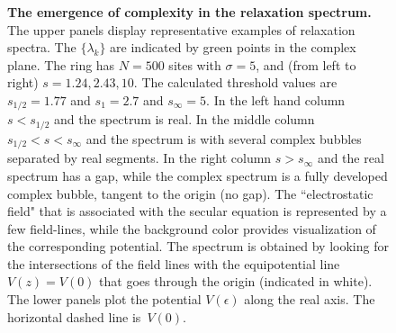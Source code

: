 \documentclass[aps,pre,floats,floatfix,twocolumn]{revtex4}
\begin{document}
\begin{figure}
\caption{\label{froots} 
{\bf The emergence of complexity in the relaxation spectrum.} 
The upper panels display representative examples of relaxation spectra.
The $\{\lambda_k\}$ are indicated by green points in the complex plane. 
The ring has $N{=}500$ sites with $\sigma{=}5$, 
and (from left to right) ${s=1.24, 2.43, 10}$. 
The calculated threshold values are ${s_{1/2}=1.77}$ and ${s_1=2.7}$ and ${s_{\infty}=5}$.
In the left hand column ${s<s_{1/2}}$ and the spectrum is real.
In the middle column ${s_{1/2} < s < s_{\infty}}$ and the spectrum is  
with several complex bubbles separated by real segments. 
In the right column  ${s>s_{\infty}}$ and the real spectrum has a gap, 
while the complex spectrum is a fully developed complex bubble, 
tangent to the origin (no gap). 
%
The ``electrostatic field" that is associated with the secular equation 
is represented by a few field-lines, while the background color provides 
visualization of the corresponding potential. 
The spectrum is obtained by looking  for the intersections 
of the field lines with the equipotential line ${V(z)=V(0)}$ 
that goes through the origin (indicated in white). 
%
The lower panels plot the potential $V(\epsilon)$ along the real axis. 
The horizontal dashed line is~$V(0)$. 
}
\end{figure}
\end{document}
